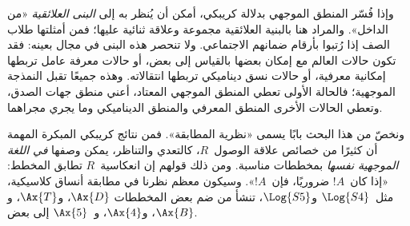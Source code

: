 \documentclass[../../../include/open-logic-section]{subfiles}
\begin{document}
وإذا فُسّر المنطق الموجهي بدلالة كريبكي، أمكن أن يُنظر به إلى
\emph{البنى العلائقية} «من الداخل». والمراد هنا بالبنية العلائقية
مجموعة وعلاقة ثنائية عليها؛ فمن أمثلتها طلاب الصف إذا رُتبوا بأرقام
ضمانهم الاجتماعي. ولا تنحصر هذه البنى في مجال بعينه: فقد تكون حالات
العالم مع إمكان بعضها بالقياس إلى بعض، أو حالات معرفة عامل تربطها
إمكانية معرفية، أو حالات نسق ديناميكي تربطها انتقالاته. وهذه جميعًا
تقبل النمذجة الموجهية؛ فالحالة الأولى تعطي المنطق الموجهي المعتاد،
أعني منطق جهات الصدق، وتعطي الحالات الأخرى المنطق المعرفي والمنطق
الديناميكي وما يجري مجراهما.

ونخصّ من هذا البحث بابًا يسمى «نظرية المطابقة». فمن نتائج كريبكي
المبكرة المهمة أن كثيرًا من خصائص علاقة الوصول~$R$، كالتعدي
والتناظر، يمكن وصفها \emph{في اللغة الموجهية نفسها} بمخططات مناسبة.
ومن ذلك قولهم إن انعكاسية~$R$ تطابق المخطط: «إذا كان~$!A$
ضروريًا، فإن~$!A$». وسيكون معظم نظرنا في مطابقة أنساق كلاسيكية،
مثل~$\Log{S4}$ و$\Log{S5}$، تنشأ من ضم بعض المخططات
$\Ax{D}$، و$\Ax{T}$، و$\Ax{B}$، و$\Ax{4}$، و~$\Ax{5}$ إلى بعض.
\end{document}
